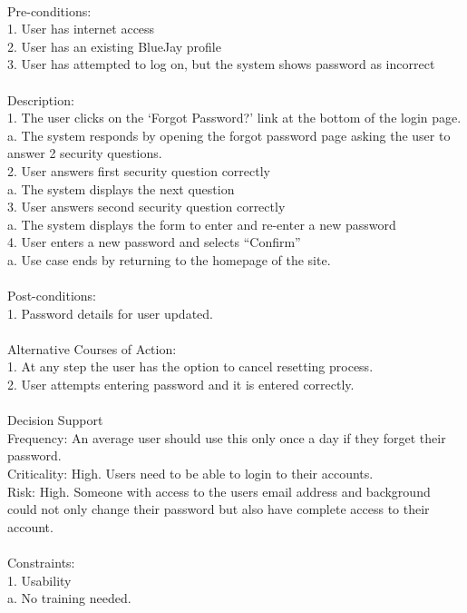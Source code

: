 \documentclass{report}
\begin{document}
\\
Pre-conditions: \\
1.	User has internet access\\
2.	User has an existing BlueJay profile\\
3.	User has attempted to log on, but the system shows password as incorrect\\
\\
Description: \\
1.	The user clicks on the ‘Forgot Password?’ link at the bottom of the login page. \\
	a.	The system responds by opening the forgot password page asking the user to answer 2 security questions.\\
2.	User answers first security question correctly\\
	a.	The system displays the next question\\
3.	User answers second security question correctly\\
	a.	The system displays the form to enter and re-enter a new password\\
4.	User enters a new password and selects “Confirm”\\
	a.	Use case ends by returning to the homepage of the site. \\
\\
Post-conditions: \\
1.	Password details for user updated.\\
\\
Alternative Courses of Action:\\
1.	At any step the user has the option to cancel resetting process.\\
2.	User attempts entering password and it is entered correctly.\\
\\
Decision Support\\
     Frequency: An average user should use this only once a day if they forget their password. \\
     Criticality: High. Users need to be able to login to their accounts.\\
     Risk: High. Someone with access to the users email address and background could not only change their password but also have complete access to their account.\\
\\
Constraints:\\
1.	Usability\\
	a.	No training needed.\\
\end{document}
